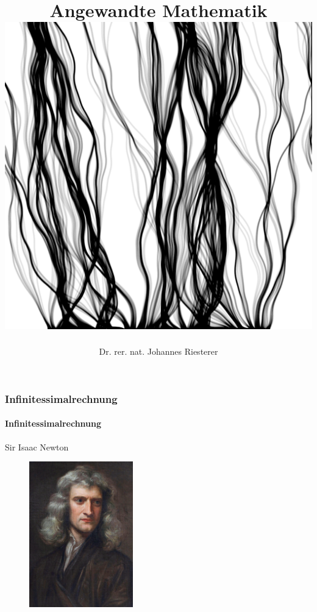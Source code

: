 \documentclass{beamer}
\begin{document}
\title[Angewandte Mathematik] %
{Angewandte Mathematik
\\
\includegraphics[scale=0.15]{images/cover}
}
\subtitle{}
\author[Dr. Johannes Riesterer] %
{Dr.  rer. nat. Johannes Riesterer}

\date[KPT 2004] %
{}

\subject{Angewandte Mathematik}

\frame{\titlepage}






\begin{frame}
    \frametitle{Infinitessimalrechnung}
    \framesubtitle{Infinitessimalrechnung}
    \begin{block}{Sir Isaac Newton}
\begin{figure}[H]
      \centering
    \includegraphics[width=0.4\textwidth]{images/Newton.jpg}
\end{figure}

\end{block}

 \end{frame}
\end{document}

